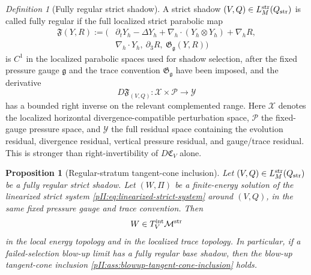 \documentclass[11pt]{article}
\numberwithin{equation}{section}
\theoremstyle{plain}
\newtheorem{proposition}{Proposition}[section]
\theoremstyle{definition}
\theoremstyle{remark}
\newtheorem{definition}{Definition}[section]
\newcommand{\str}{\mathrm{str}}
\begin{document}
\begin{definition}[Fully regular strict shadow]\label{pII:def:regular-strict-shadow}
A strict shadow \((V,Q)\in L_M^{\str}(Q_{\rm str})\) is called fully regular if the full localized strict parabolic map
\[
\begin{aligned}
        \mathfrak F(Y,R)
        :=\big(&\partial_tY_h-\Delta Y_h+\nabla_h\cdot(Y_h\otimes Y_h)+\nabla_hR,\\
        &\nabla_h\cdot Y_h,\ \partial_3R,\ \mathfrak G_{\mathfrak g}(Y,R)\big)
\end{aligned}
\]
is \(C^1\) in the localized parabolic spaces used for shadow selection, after the fixed pressure gauge \(\mathfrak g\) and the trace convention \(\mathfrak G_{\mathfrak g}\) have been imposed, and the derivative
\[
        D\mathfrak F_{(V,Q)}:\mathcal X\times\mathcal P\to\mathcal Y
\]
has a bounded right inverse on the relevant complemented range.  Here \(\mathcal X\) denotes the localized horizontal divergence-compatible perturbation space, \(\mathcal P\) the fixed-gauge pressure space, and \(\mathcal Y\) the full residual space containing the evolution residual, divergence residual, vertical pressure residual, and gauge/trace residual.  This is stronger than right-invertibility of \(D\mathfrak C_V\) alone.
\end{definition}

\begin{proposition}[Regular-stratum tangent-cone inclusion]\label{pII:prop:regular-stratum-inclusion}
Let \((V,Q)\in L_M^{\str}(Q_{\rm str})\) be a fully regular strict shadow.  Let \((W,\Pi)\) be a finite-energy solution of the linearized strict system \eqref{pII:eq:linearized-strict-system} around \((V,Q)\), in the same fixed pressure gauge and trace convention.  Then
\[
        W\in T^{\rm int}_V\mathcal M^{\str}
\]
in the local energy topology and in the localized trace topology.  In particular, if a failed-selection blow-up limit has a fully regular base shadow, then the blow-up tangent-cone inclusion \cref{pII:ass:blowup-tangent-cone-inclusion} holds.
\end{proposition}
\end{document}
